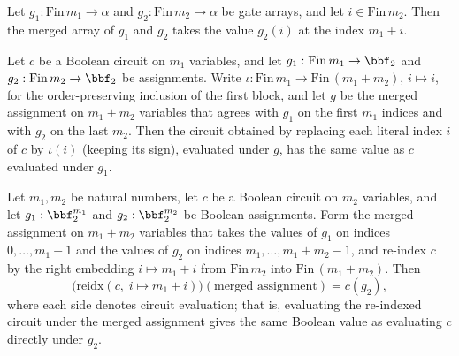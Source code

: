 \begin{lemma}
\label{LMN.mergeGates_natAdd}
\leanok
{}
Let $g_1 : \mathrm{Fin}\,m_1 \to \alpha$ and $g_2 : \mathrm{Fin}\,m_2 \to \alpha$ be
gate arrays, and let $i \in \mathrm{Fin}\,m_2$. Then the merged array of $g_1$ and $g_2$
takes the value $g_2(i)$ at the index $m_1 + i$.
\end{lemma}

\begin{lemma}
\label{LMN.reidx_eval_mergeGates_left}
\leanok
{}
Let $c$ be a Boolean circuit on $m_1$ variables, and let $g_1 : \mathrm{Fin}\,m_1 \to
\bbf_2$ and $g_2 : \mathrm{Fin}\,m_2 \to \bbf_2$ be assignments. Write $\iota :
\mathrm{Fin}\,m_1 \to \mathrm{Fin}\,(m_1+m_2)$, $i \mapsto i$, for the order-preserving
inclusion of the first block, and let $g$ be the merged assignment on $m_1 + m_2$
variables that agrees with $g_1$ on the first $m_1$ indices and with $g_2$ on the last
$m_2$. Then the circuit obtained by replacing each literal index $i$ of $c$ by
$\iota(i)$ (keeping its sign), evaluated under $g$, has the same value as $c$ evaluated
under $g_1$.
\end{lemma}

\begin{lemma}
\label{LMN.reidx_eval_mergeGates_right}
\leanok
{}
Let $m_1, m_2$ be natural numbers, let $c$ be a Boolean circuit on $m_2$ variables, and
let $g_1 : \bbf_2^{m_1}$ and $g_2 : \bbf_2^{m_2}$ be Boolean assignments. Form the
merged assignment on $m_1 + m_2$ variables that takes the values of $g_1$ on indices
$0,\dots,m_1-1$ and the values of $g_2$ on indices $m_1,\dots,m_1+m_2-1$, and re-index
$c$ by the right embedding $i \mapsto m_1 + i$ from $\mathrm{Fin}\,m_2$ into
$\mathrm{Fin}\,(m_1+m_2)$. Then \[ \bigl(\mathrm{reidx}(c,\; i \mapsto m_1 +
i)\bigr)(\text{merged assignment}) = c(g_2), \] where each side denotes circuit
evaluation; that is, evaluating the re-indexed circuit under the merged assignment gives
the same Boolean value as evaluating $c$ directly under $g_2$.
\end{lemma}

